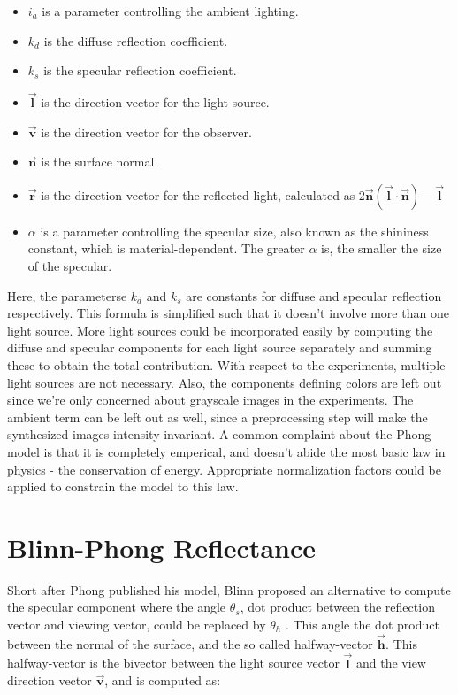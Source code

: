 \begin{itemize}
	\item[] $i_a$ is a parameter controlling the ambient lighting.
	\item[] $k_d$ is the diffuse reflection coefficient.
	\item[] $k_s$ is the specular reflection coefficient.
	\item[] $\vec{\mathbf{l}}$ is the direction vector for the light source.
	\item[] $\vec{\mathbf{v}}$ is the direction vector for the observer.
	\item[] $\vec{\mathbf{n}}$ is the surface normal.
	\item[] $\vec{\mathbf{r}}$ is the direction vector for the reflected light, 
		calculated as $2\vec{\mathbf{n}}(\vec{\mathbf{l}} \cdot \vec{\mathbf{n}}) - \vec{\mathbf{l}}$
	\item[] $\alpha$ is a parameter controlling the specular size, also known as the shininess constant, which is material-dependent. The greater $\alpha$ is, the smaller the size of the specular.
\end{itemize}

Here, the parameterse $k_d$ and $k_s$ are constants for diffuse and specular reflection respectively. 
This formula is simplified such that it doesn't involve more than one light source. More light sources could be incorporated easily by computing the diffuse and specular components for each light source separately and summing these to obtain the total contribution. With respect to the experiments, multiple light sources are not necessary. Also, the components defining colors are left out since we're only concerned about grayscale images in the experiments. The ambient term can be left out as well, since a preprocessing step will make the synthesized images intensity-invariant. A common complaint about the Phong model is that it is completely emperical, and doesn't abide the most basic law in physics - the conservation of energy. Appropriate normalization factors could be applied to constrain the model to this law.

	\section{Blinn-Phong Reflectance}\label{BlinnPhong}
		Short after Phong published his model, Blinn proposed an alternative to compute the specular component where the angle $\theta_s$, dot product between the reflection vector and viewing vector, could be replaced by $\theta_h$ \cite{Blinn}. This angle the dot product between the normal of the surface, and the so called halfway-vector $\vec{\mathbf{h}}$. This halfway-vector is the bivector between the light source vector $\vec{\mathbf{l}}$ and the view direction vector $\vec{\mathbf{v}}$, and is computed as:

